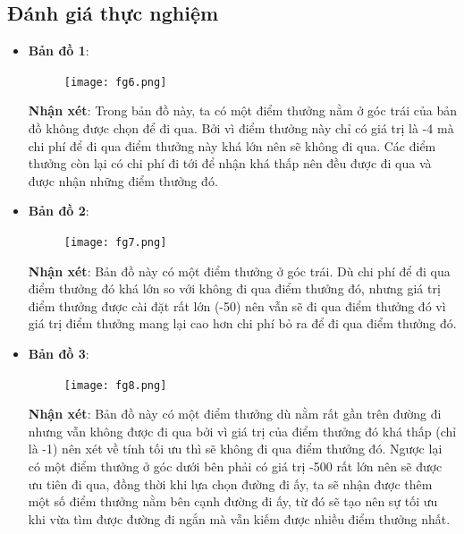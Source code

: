 \documentclass[11pt]{article} %
\begin{document}
\subsection{Đánh giá thực nghiệm}
\begin{itemize}
	\item \textbf{Bản đồ 1}:
	\begin{figure}[h] %
		\centering
		\texttt{[image: fg6.png]} %
	\end{figure}
	
	\textbf{Nhận xét}: Trong bản đồ này, ta có một điểm thưởng nằm ở góc trái của bản đồ không được chọn để đi qua. Bởi vì điểm thưởng này chỉ có giá trị là -4 mà chi phí để đi qua điểm thưởng này khá lớn nên sẽ không đi qua. Các điểm thưởng còn lại có chi phí đi tới để nhận khá thấp nên đều được đi qua và được nhận những điểm thưởng đó.

	
	\item \textbf{Bản đồ 2}:
	\begin{figure}[h]
		\centering
		\texttt{[image: fg7.png]} %
	\end{figure}
	
	\textbf{Nhận xét}: Bản đồ này có một điểm thưởng ở góc trái. Dù chi phí để đi qua điểm thưởng đó khá lớn so với không đi qua điểm thưởng đó, nhưng giá trị điểm thưởng được cài đặt rất lớn (-50) nên vẫn sẽ đi qua điểm thưởng đó vì giá trị điểm thưởng mang lại cao hơn chi phí bỏ ra để đi qua điểm thưởng đó. 
	

	\newpage
	\item \textbf{Bản đồ 3}:
	\begin{figure}[h]
		\centering
		\texttt{[image: fg8.png]} %
	\end{figure}
	
	\textbf{Nhận xét}: Bản đồ này có một điểm thưởng dù nằm rất gần trên đường đi nhưng vẫn không được đi qua bởi vì giá trị của điểm thưởng đó khá thấp (chỉ là -1) nên xét về tính tối ưu thì sẽ không đi qua điểm thưởng đó. Ngược lại có một điểm thưởng ở góc dưới bên phải có giá trị -500 rất lớn nên sẽ được ưu tiên đi qua, đồng thời khi lựa chọn đường đi ấy, ta sẽ nhận được thêm một số điểm thưởng nằm bên cạnh đường đi ấy, từ đó sẽ tạo nên sự tối ưu khi vừa tìm được đường đi ngắn mà vẫn kiếm được nhiều điểm thưởng nhất.\\\\\\\\\\\\\\\\\\
	
\end{itemize}



\end{document}
